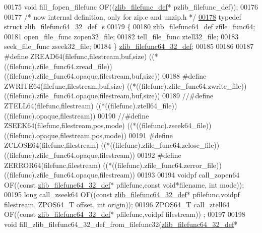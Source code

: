 \begin{DoxyCode}
00175 \textcolor{keywordtype}{void} fill\_fopen\_filefunc OF((\hyperlink{structzlib__filefunc__def__s}{zlib\_filefunc\_def}* pzlib\_filefunc\_def));
00176 
00177 \textcolor{comment}{/* now internal definition, only for zip.c and unzip.h */}
\hyperlink{structzlib__filefunc64__32__def__s}{00178} \textcolor{keyword}{typedef} \textcolor{keyword}{struct }\hyperlink{structzlib__filefunc64__32__def__s}{zlib\_filefunc64\_32\_def\_s}
00179 \{
00180     \hyperlink{structzlib__filefunc64__def__s}{zlib\_filefunc64\_def} zfile\_func64;
00181     open\_file\_func      zopen32\_file;
00182     tell\_file\_func      ztell32\_file;
00183     seek\_file\_func      zseek32\_file;
00184 \} \hyperlink{structzlib__filefunc64__32__def__s}{zlib\_filefunc64\_32\_def};
00185 
00186 
00187 \textcolor{preprocessor}{#define ZREAD64(filefunc,filestream,buf,size)     ((*((filefunc).zfile\_func64.zread\_file))  
       ((filefunc).zfile\_func64.opaque,filestream,buf,size))}
00188 \textcolor{preprocessor}{#define ZWRITE64(filefunc,filestream,buf,size)    ((*((filefunc).zfile\_func64.zwrite\_file)) 
       ((filefunc).zfile\_func64.opaque,filestream,buf,size))}
00189 \textcolor{comment}{//#define ZTELL64(filefunc,filestream)            ((*((filefunc).ztell64\_file))
       ((filefunc).opaque,filestream))}
00190 \textcolor{comment}{//#define ZSEEK64(filefunc,filestream,pos,mode)   ((*((filefunc).zseek64\_file))
       ((filefunc).opaque,filestream,pos,mode))}
00191 \textcolor{preprocessor}{#define ZCLOSE64(filefunc,filestream)             ((*((filefunc).zfile\_func64.zclose\_file)) 
       ((filefunc).zfile\_func64.opaque,filestream))}
00192 \textcolor{preprocessor}{#define ZERROR64(filefunc,filestream)             ((*((filefunc).zfile\_func64.zerror\_file)) 
       ((filefunc).zfile\_func64.opaque,filestream))}
00193 
00194 voidpf call\_zopen64 OF((\textcolor{keyword}{const} \hyperlink{structzlib__filefunc64__32__def__s}{zlib\_filefunc64\_32\_def}* pfilefunc,\textcolor{keyword}{const} \textcolor{keywordtype}{void}*filename,\textcolor{keywordtype}{
      int} mode));
00195 \textcolor{keywordtype}{long}    call\_zseek64 OF((\textcolor{keyword}{const} \hyperlink{structzlib__filefunc64__32__def__s}{zlib\_filefunc64\_32\_def}* pfilefunc,voidpf filestream, 
      ZPOS64\_T offset, \textcolor{keywordtype}{int} origin));
00196 ZPOS64\_T call\_ztell64 OF((\textcolor{keyword}{const} \hyperlink{structzlib__filefunc64__32__def__s}{zlib\_filefunc64\_32\_def}* pfilefunc,voidpf filestream))
      ;
00197 
00198 \textcolor{keywordtype}{void}    fill\_zlib\_filefunc64\_32\_def\_from\_filefunc32(\hyperlink{structzlib__filefunc64__32__def__s}{zlib\_filefunc64\_32\_def}* 

\end{DoxyCode}

